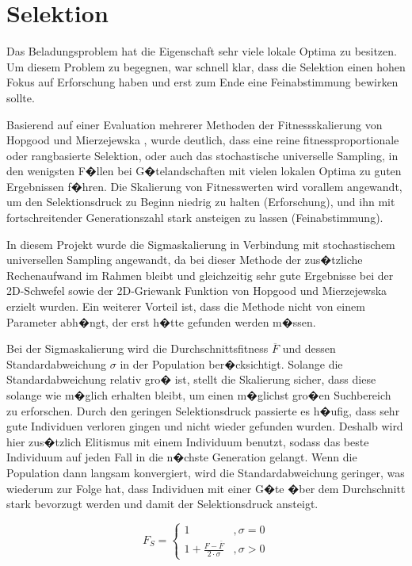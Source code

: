\documentclass[a4paper,abstracton,12pt]{scrartcl}
\begin{document}
\section{Selektion}

Das Beladungsproblem hat die Eigenschaft sehr viele lokale Optima zu besitzen. Um diesem Problem zu begegnen, war schnell klar, dass die Selektion einen hohen Fokus auf Erforschung haben und erst zum Ende eine Feinabstimmung bewirken sollte.

Basierend auf einer Evaluation mehrerer Methoden der Fitnessskalierung von Hopgood und Mierzejewska \cite{transformranking}, wurde deutlich, dass eine reine fitnessproportionale oder rangbasierte Selektion, oder auch das stochastische universelle Sampling, in den wenigsten F�llen bei G�telandschaften mit vielen lokalen Optima zu guten Ergebnissen f�hren. Die Skalierung von Fitnesswerten wird vorallem angewandt, um den Selektionsdruck zu Beginn niedrig zu halten (Erforschung), und ihn mit fortschreitender Generationszahl stark ansteigen zu lassen (Feinabstimmung).

In diesem Projekt wurde die Sigmaskalierung in Verbindung mit stochastischem universellen Sampling angewandt, da bei dieser Methode der zus�tzliche Rechenaufwand im Rahmen bleibt und gleichzeitig sehr gute Ergebnisse bei der 2D-Schwefel sowie der 2D-Griewank Funktion von Hopgood und Mierzejewska erzielt wurden. Ein weiterer Vorteil ist, dass die Methode nicht von einem Parameter abh�ngt, der erst h�tte gefunden werden m�ssen.

Bei der Sigmaskalierung wird die Durchschnittsfitness $\overline{F}$ und dessen Standardabweichung $\sigma$ in der Population ber�cksichtigt. Solange die Standardabweichung relativ gro� ist, stellt die Skalierung sicher, dass diese solange wie m�glich erhalten bleibt, um einen m�glichst gro�en Suchbereich zu erforschen. Durch den geringen Selektionsdruck passierte es h�ufig, dass sehr gute Individuen verloren gingen und nicht wieder gefunden wurden. Deshalb wird hier zus�tzlich Elitismus mit einem Individuum benutzt, sodass das beste Individuum auf jeden Fall in die n�chste Generation gelangt. Wenn die Population dann langsam konvergiert, wird die Standardabweichung geringer, was wiederum zur Folge hat, dass Individuen mit einer G�te �ber dem Durchschnitt stark bevorzugt werden und damit der Selektionsdruck ansteigt.

\begin{equation}
F_S = \begin{cases} 
	1 & ,\sigma = 0\\
	1 + \frac{F - \overline{F}}{2 \cdot \sigma} & ,\sigma > 0
\end{cases}
\end{equation}
\end{document}
